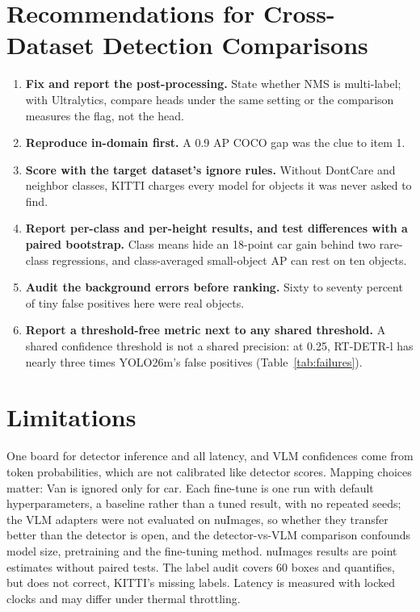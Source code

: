 \documentclass[conference]{IEEEtran}
\begin{document}
\section{Recommendations for Cross-Dataset Detection Comparisons}\label{sec:practice}
\begin{enumerate}
  \item \textbf{Fix and report the post-processing.} State whether NMS is multi-label; with Ultralytics, compare
  heads under the same setting or the comparison measures the flag, not the head.
  \item \textbf{Reproduce in-domain first.} A 0.9 AP COCO gap was the clue to item 1.
  \item \textbf{Score with the target dataset's ignore rules.} Without DontCare and neighbor classes, KITTI
  charges every model for objects it was never asked to find.
  \item \textbf{Report per-class and per-height results, and test differences with a paired bootstrap.} Class means
  hide an 18-point car gain behind two rare-class regressions, and class-averaged small-object AP can rest on ten
  objects.
  \item \textbf{Audit the background errors before ranking.} Sixty to seventy percent of tiny false positives here
  were real objects.
  \item \textbf{Report a threshold-free metric next to any shared threshold.} A shared confidence threshold is not a
  shared precision: at 0.25, RT-DETR-l has nearly three times YOLO26m's false positives (Table~\ref{tab:failures}).
\end{enumerate}

\section{Limitations}
One board for detector inference and all latency, and VLM confidences come from token probabilities, which are not calibrated like detector
scores. Mapping choices matter: Van is ignored only for car. Each fine-tune is one run with default hyperparameters,
a baseline rather than a tuned result, with no repeated seeds; the VLM adapters were not evaluated on nuImages, so
whether they transfer better than the detector is open, and the detector-vs-VLM comparison confounds model size,
pretraining and the fine-tuning method. nuImages results are point estimates without paired tests. The label audit covers 60 boxes and quantifies, but does not correct, KITTI's
missing labels. Latency is measured with locked clocks and may differ under thermal throttling.
\end{document}
